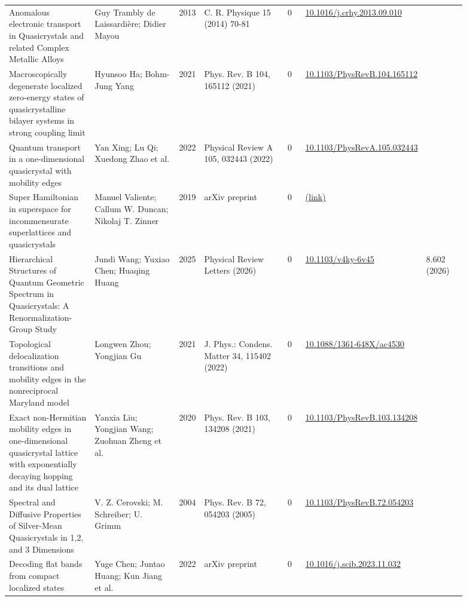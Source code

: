 \documentclass[10pt,a4paper]{article}
\begin{document}
{\begin{longtable}{p{0.192\linewidth}p{0.192\linewidth}p{0.043\linewidth}p{0.192\linewidth}p{0.043\linewidth}p{0.132\linewidth}p{0.096\linewidth}}
Anomalous electronic transport in Quasicrystals and related Complex Metallic Alloys & Guy Trambly de Laissardière; Didier Mayou & 2013 & C. R. Physique 15 (2014) 70-81 & 0 & \href{https://doi.org/10.1016/j.crhy.2013.09.010}{10.1016/j.crhy.2013.09.010} &  \\
Macroscopically degenerate localized zero-energy states of quasicrystalline bilayer systems in strong coupling limit & Hyunsoo Ha; Bohm-Jung Yang & 2021 & Phys. Rev. B 104, 165112 (2021) & 0 & \href{https://doi.org/10.1103/PhysRevB.104.165112}{10.1103/PhysRevB.104.165112} &  \\
Quantum transport in a one-dimensional quasicrystal with mobility edges & Yan Xing; Lu Qi; Xuedong Zhao et al. & 2022 & Physical Review A 105, 032443 (2022) & 0 & \href{https://doi.org/10.1103/PhysRevA.105.032443}{10.1103/PhysRevA.105.032443} &  \\
Super Hamiltonian in superspace for incommensurate superlattices and quasicrystals & Manuel Valiente; Callum W. Duncan; Nikolaj T. Zinner & 2019 & arXiv preprint & 0 & \href{http://arxiv.org/abs/1908.03214v1}{(link)} &  \\
Hierarchical Structures of Quantum Geometric Spectrum in Quasicrystals: A Renormalization-Group Study & Jundi Wang; Yuxiao Chen; Huaqing Huang & 2025 & Physical Review Letters (2026) & 0 & \href{https://doi.org/10.1103/v4ky-6v45}{10.1103/v4ky-6v45} & 8.602 (2026) \\
Topological delocalization transitions and mobility edges in the nonreciprocal Maryland model & Longwen Zhou; Yongjian Gu & 2021 & J. Phys.: Condens. Matter 34, 115402 (2022) & 0 & \href{https://doi.org/10.1088/1361-648X/ac4530}{10.1088/1361-648X/ac4530} &  \\
Exact non-Hermitian mobility edges in one-dimensional quasicrystal lattice with exponentially decaying hopping and its dual lattice & Yanxia Liu; Yongjian Wang; Zuohuan Zheng et al. & 2020 & Phys. Rev. B 103, 134208 (2021) & 0 & \href{https://doi.org/10.1103/PhysRevB.103.134208}{10.1103/PhysRevB.103.134208} &  \\
Spectral and Diffusive Properties of Silver-Mean Quasicrystals in 1,2, and 3 Dimensions & V. Z. Cerovski; M. Schreiber; U. Grimm & 2004 & Phys. Rev. B 72, 054203 (2005) & 0 & \href{https://doi.org/10.1103/PhysRevB.72.054203}{10.1103/PhysRevB.72.054203} &  \\
Decoding flat bands from compact localized states & Yuge Chen; Juntao Huang; Kun Jiang et al. & 2022 & arXiv preprint & 0 & \href{https://doi.org/10.1016/j.scib.2023.11.032}{10.1016/j.scib.2023.11.032} &  \\

\end{longtable}}
\end{document}
